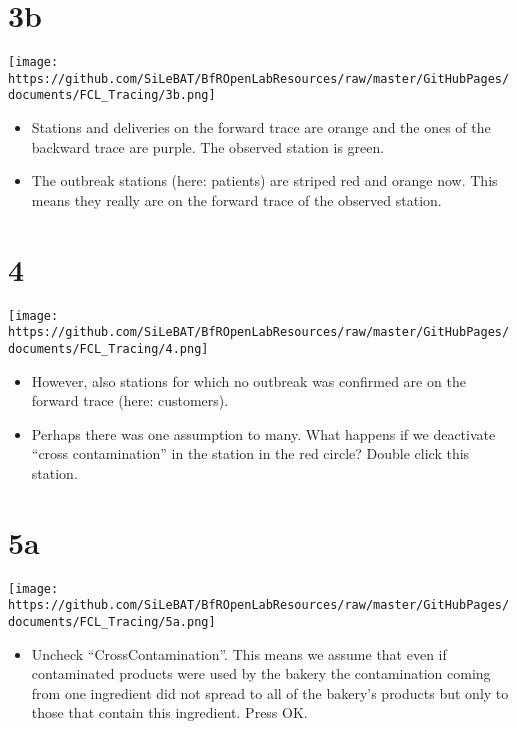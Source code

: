 \documentclass[10pt]{beamer}
\begin{document}
\section{3b}
\begin{frame}
	\begin{center}
  		\texttt{[image: https://github.com/SiLeBAT/BfROpenLabResources/raw/master/GitHubPages/documents/FCL\_Tracing/3b.png]}
	\end{center}
	\begin{itemize}
		\item Stations and deliveries on the forward trace are orange and the ones of the backward trace are purple. The observed station is green.
		\item The outbreak stations (here: patients) are striped red and orange now. This means they really are on the forward trace of the observed station.
	\end{itemize}
\end{frame}

\section{4}
\begin{frame}
	\begin{center}
  		\texttt{[image: https://github.com/SiLeBAT/BfROpenLabResources/raw/master/GitHubPages/documents/FCL\_Tracing/4.png]}
	\end{center}
	\begin{itemize}
		\item However, also stations for which no outbreak was confirmed are on the forward trace (here: customers).
		\item Perhaps there was one assumption to many. What happens if we deactivate ``cross contamination'' in the station in the red circle? Double click this station.
	\end{itemize}
\end{frame}

\section{5a}
\begin{frame}
	\begin{center}
  		\texttt{[image: https://github.com/SiLeBAT/BfROpenLabResources/raw/master/GitHubPages/documents/FCL\_Tracing/5a.png]}
	\end{center}
	\begin{itemize}
		\item Uncheck ``CrossContamination''. This means we assume that even if contaminated products were used by the bakery the contamination coming from one ingredient did not spread to all of the bakery’s products but only to those that contain this ingredient. Press OK.
	\end{itemize}
\end{frame}
\end{document}
